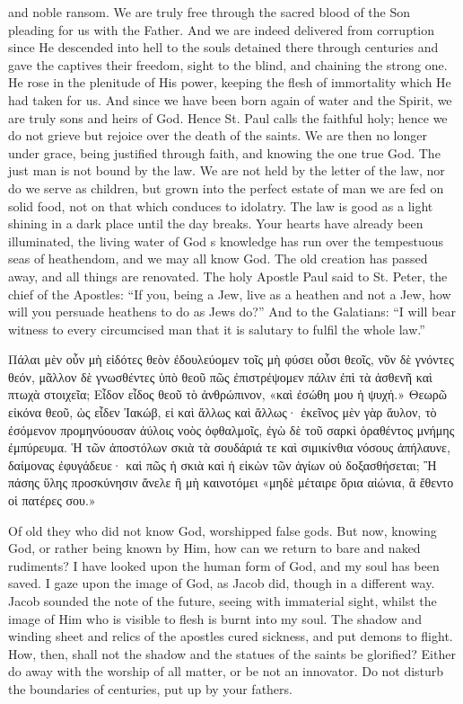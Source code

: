 \documentclass[10pt]{book}
\newcommand{\switchgreek}[1][]{\selectlanguage{polutonikogreek} \switchcolumn*[#1]}
\newcommand{\switchenglish}{\selectlanguage{english} \switchcolumn}
\begin{document}
\begin{paracol}{2}
and noble ransom. We are truly free through 
the sacred blood of the Son pleading for us 
with the Father. And we are indeed delivered 
from corruption since He descended into hell 
to the souls detained there through centuries 
and gave the captives their freedom, sight to 
the blind, and chaining the strong one. He 
rose in the plenitude of His power, keeping the 
flesh of immortality which He had taken for 
us. And since we have been born again of 
water and the Spirit, we are truly sons and 
heirs of God. Hence St. Paul calls the faithful 
holy; hence we do not grieve but rejoice over 
the death of the saints. We are then no 
longer under grace, being justified through 
faith, and knowing the one true God. The 
just man is not bound by the law. We are 
not held by the letter of the law, nor do we 
serve as children, but grown into the perfect 
estate of man we are fed on solid food, not 
on that which conduces to idolatry. The law 
is good as a light shining in a dark place 
until the day breaks. Your hearts have already 
been illuminated, the living water of God s 
knowledge has run over the tempestuous seas 
of heathendom, and we may all know God. 
The old creation has passed away, and all 
things are renovated. The holy Apostle Paul 
said to St. Peter, the chief of the Apostles:
``If you, being a Jew, live as a heathen and 
not a Jew, how will you persuade heathens 
to do as Jews do?'' And to the Galatians: 
``I will bear witness to every circumcised man 
that it is salutary to fulfil the whole law.''

\switchgreek

Πάλαι μὲν οὖν μὴ εἰδότες θεὸν ἐδουλεύομεν τοῖς μὴ φύσει οὖσι θεοῖς, νῦν δὲ γνόντες θεόν, μᾶλλον δὲ γνωσθέντες ὑπὸ θεοῦ πῶς ἐπιστρέψομεν πάλιν ἐπὶ τὰ ἀσθενῆ καὶ πτωχὰ στοιχεῖα; Εἶδον εἶδος θεοῦ τὸ ἀνθρώπινον, «καὶ ἐσώθη μου ἡ ψυχή.»
Θεωρῶ εἰκόνα θεοῦ, ὡς εἶδεν Ἰακώβ, εἰ καὶ ἄλλως καὶ ἄλλως· ἐκεῖνος μὲν γὰρ ἄυλον, τὸ ἐσόμενον προμηνύουσαν ἀύλοις νοὸς ὀφθαλμοῖς, ἐγὼ δὲ τοῦ σαρκὶ ὁραθέντος μνήμης ἐμπύρευμα.
Ἡ τῶν ἀποστόλων σκιὰ τὰ σουδάριά τε καὶ σιμικίνθια νόσους ἀπήλαυνε, δαίμονας ἐφυγάδευε· καὶ πῶς ἡ σκιὰ καὶ ἡ εἰκὼν τῶν ἁγίων οὐ δοξασθήσεται; Ἢ πάσης ὕλης προσκύνησιν ἄνελε ἢ μὴ καινοτόμει «μηδὲ μέταιρε ὅρια αἰώνια, ἃ ἔθεντο οἱ πατέρες σου.»

\switchenglish

Of old they who did not know God, worshipped false gods. But now, knowing God,
or rather being known by Him, how can we 
return to bare and naked rudiments? I have 
looked upon the human form of God, and my 
soul has been saved. I gaze upon the image 
of God, as Jacob did, though in a different 
way. Jacob sounded the note of the future, 
seeing with immaterial sight, whilst the image 
of Him who is visible to flesh is burnt into my 
soul. The shadow and winding sheet and relics 
of the apostles cured sickness, and put demons 
to flight. How, then, shall not the shadow 
and the statues of the saints be glorified? 
Either do away with the worship of all matter, 
or be not an innovator. Do not disturb the 
boundaries of centuries, put up by your fathers. 


\end{paracol}
\end{document}
